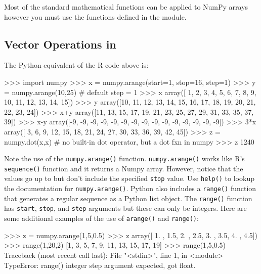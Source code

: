 Most of the standard mathematical functions can be applied to NumPy
arrays however you must use the functions defined in the
\numpy module.
%





\subsection{Vector Operations in \numpy}

The Python equivalent of the R code above is:
%
\begin{python}
>>> import numpy
>>> x = numpy.arange(start=1, stop=16, step=1)
>>> y = numpy.arange(10,25) # default step = 1
>>> x
array([ 1,  2,  3,  4,  5,  6,  7,  8,  9, 10, 11, 12, 13, 14, 15])
>>> y
array([10, 11, 12, 13, 14, 15, 16, 17, 18, 19, 20, 21, 22, 23, 24])
>>> x+y
array([11, 13, 15, 17, 19, 21, 23, 25, 27, 29, 31, 33, 35, 37, 39])
>>> x-y
array([-9, -9, -9, -9, -9, -9, -9, -9, -9, -9, -9, -9, -9, -9, -9])
>>> 3*x
array([ 3,  6,  9, 12, 15, 18, 21, 24, 27, 30, 33, 36, 39, 42, 45])
>>> z = numpy.dot(x,x) # no built-in dot operator, but a dot fxn in numpy
>>> z
1240
\end{python}
%
Note the use of the \lstinline!numpy.arange()! function.
\lstinline!numpy.arange()! works like R's \lstinline!sequence()!
function and it returns a Numpy array. However, notice that the values
go up to but don't include the specified \lstinline!stop! value. Use
\lstinline!help()! to lookup the documentation for
\lstinline!numpy.arange()!. Python also includes a \lstinline!range()!
function that generates a regular sequence as a Python list object. The
\lstinline!range()! function has \lstinline!start!, \lstinline!stop!,
and \lstinline!step! arguments but these can only be integers. Here are
some additional examples of the use of \lstinline!arange()! and
\lstinline!range()!:

\begin{python}
>>> z = numpy.arange(1,5,0.5) 
>>> z
array([ 1. ,  1.5,  2. ,  2.5,  3. ,  3.5,  4. ,  4.5])
>>> range(1,20,2)
[1, 3, 5, 7, 9, 11, 13, 15, 17, 19]
>>> range(1,5,0.5)
Traceback (most recent call last):
  File "<stdin>", line 1, in <module>
TypeError: range() integer step argument expected, got float.
\end{python}



